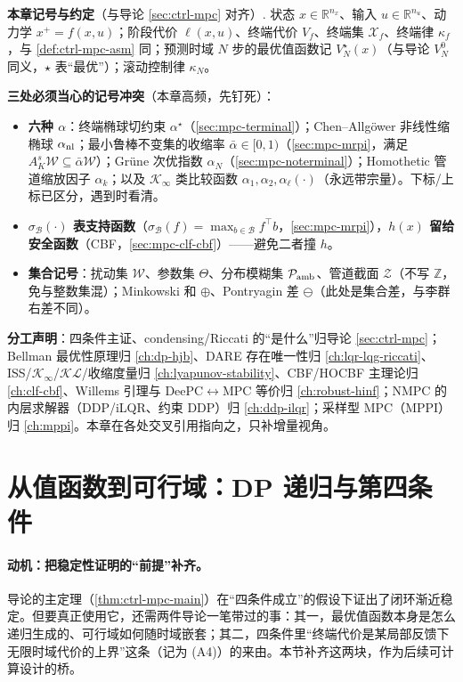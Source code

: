\begin{note}
\textbf{本章记号与约定}（与导论 \cref{sec:ctrl-mpc} 对齐）.\;
状态 $x\in\mathbb R^{n_x}$、输入 $u\in\mathbb R^{n_u}$、动力学 $x^+=f(x,u)$；阶段代价 $\ell(x,u)$、终端代价 $V_f$、终端集 $\mathcal X_f$、终端律 $\kappa_f$，与 \cref{def:ctrl-mpc-asm} 同；预测时域 $N$ 步的最优值函数记 $V_N^\star(x)$（与导论 $V_N^0$ 同义，$\star$ 表“最优”）；滚动控制律 $\kappa_N$。

\textbf{三处必须当心的记号冲突}（本章高频，先钉死）：
\begin{itemize}
  \item \textbf{六种 $\alpha$}：终端椭球切约束 $\alpha^\star$（\cref{sec:mpc-terminal}）；Chen--Allgöwer 非线性缩椭球 $\alpha_{\rm nl}$；最小鲁棒不变集的收缩率 $\bar\alpha\in[0,1)$（\cref{sec:mpc-mrpi}，满足 $A_K^s\mathcal W\subseteq\bar\alpha\mathcal W$）；Grüne 次优指数 $\alpha_N$（\cref{sec:mpc-noterminal}）；Homothetic 管道缩放因子 $\alpha_k$；以及 $\mathcal K_\infty$ 类比较函数 $\alpha_1,\alpha_2,\alpha_\ell(\cdot)$（永远带宗量）。下标/上标已区分，遇到时看清。
  \item \textbf{$\sigma_{\mathcal B}(\cdot)$ 表支持函数}（$\sigma_{\mathcal B}(f)=\max_{b\in\mathcal B}f^\top b$，\cref{sec:mpc-mrpi}），\textbf{$h(x)$ 留给安全函数}（CBF，\cref{sec:mpc-clf-cbf}）——避免二者撞 $h$。
  \item \textbf{集合记号}：扰动集 $\mathcal W$、参数集 $\Theta$、分布模糊集 $\mathcal P_{\rm amb}$、管道截面 $\mathcal Z$（不写 $\mathbb Z$，免与整数集混）；Minkowski 和 $\oplus$、Pontryagin 差 $\ominus$（此处是集合差，与李群右差不同）。
\end{itemize}
\textbf{分工声明}：四条件主证、condensing/Riccati 的“是什么”归导论 \cref{sec:ctrl-mpc}；Bellman 最优性原理归 \cref{ch:dp-hjb}、DARE 存在唯一性归 \cref{ch:lqr-lqg-riccati}、ISS/$\mathcal K_\infty$/$\mathcal{KL}$/收缩度量归 \cref{ch:lyapunov-stability}、CBF/HOCBF 主理论归 \cref{ch:clf-cbf}、Willems 引理与 DeePC$\leftrightarrow$MPC 等价归 \cref{ch:robust-hinf}；NMPC 的内层求解器（DDP/iLQR、约束 DDP）归 \cref{ch:ddp-ilqr}；采样型 MPC（MPPI）归 \cref{ch:mppi}。本章在各处交叉引用指向之，只补增量视角。
\end{note}

\section{从值函数到可行域：DP 递归与第四条件}
\label{sec:mpc-dp-recursion}

\paragraph{动机：把稳定性证明的“前提”补齐。}
导论的主定理（\cref{thm:ctrl-mpc-main}）在“四条件成立”的假设下证出了闭环渐近稳定。但要真正使用它，还需两件导论一笔带过的事：其一，最优值函数本身是怎么递归生成的、可行域如何随时域嵌套；其二，四条件里“终端代价是某局部反馈下无限时域代价的上界”这条（记为 (A4)）的来由。本节补齐这两块，作为后续可计算设计的桥。

